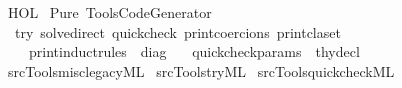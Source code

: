 %
\begin{isabellebody}%
%
%
\isadelimdocument
%
\endisadelimdocument
%
\isatagdocument
%
\isamarkuptrue%
%
\endisatagdocument
{\isafolddocument}%
%
\isadelimdocument
%
\endisadelimdocument
%
\isadelimtheory
%
\endisadelimtheory
%
\isatagtheory
{}\isamarkupfalse%
\ HOL\isanewline
{}\ Pure\ Tools{\isachardot}{\kern0pt}Code{\isacharunderscore}{\kern0pt}Generator\isanewline
{}\isanewline
\ \ {\isachardoublequoteopen}try{\isachardoublequoteclose}\ {\isachardoublequoteopen}solve{\isacharunderscore}{\kern0pt}direct{\isachardoublequoteclose}\ {\isachardoublequoteopen}quickcheck{\isachardoublequoteclose}\ {\isachardoublequoteopen}print{\isacharunderscore}{\kern0pt}coercions{\isachardoublequoteclose}\ {\isachardoublequoteopen}print{\isacharunderscore}{\kern0pt}claset{\isachardoublequoteclose}\isanewline
\ \ \ \ {\isachardoublequoteopen}print{\isacharunderscore}{\kern0pt}induct{\isacharunderscore}{\kern0pt}rules{\isachardoublequoteclose}\ {\isacharcolon}{\kern0pt}{\isacharcolon}{\kern0pt}\ diag\ \isanewline
\ \ {\isachardoublequoteopen}quickcheck{\isacharunderscore}{\kern0pt}params{\isachardoublequoteclose}\ {\isacharcolon}{\kern0pt}{\isacharcolon}{\kern0pt}\ thy{\isacharunderscore}{\kern0pt}decl\isanewline
{}\ {\isachardoublequoteopen}{\isacharquery}{\kern0pt}{\isacharless}{\kern0pt}{\isachardoublequoteclose}\ {\isacharequal}{\kern0pt}\ {\isachardoublequoteopen}{\isasymexists}\isactrlsub {\isasymle}\isanewline
{}%
\endisatagtheory
{\isafoldtheory}%
%
\isadelimtheory
\isanewline
%
\endisadelimtheory
%
\isadelimML
\isanewline
%
\endisadelimML
%
\isatagML
{}\isamarkupfalse%
\ {\isacartoucheopen}{\isachartilde}{\kern0pt}{\isachartilde}{\kern0pt}{\isacharslash}{\kern0pt}src{\isacharslash}{\kern0pt}Tools{\isacharslash}{\kern0pt}misc{\isacharunderscore}{\kern0pt}legacy{\isachardot}{\kern0pt}ML{\isacartoucheclose}\isanewline
{}\isamarkupfalse%
\ {\isacartoucheopen}{\isachartilde}{\kern0pt}{\isachartilde}{\kern0pt}{\isacharslash}{\kern0pt}src{\isacharslash}{\kern0pt}Tools{\isacharslash}{\kern0pt}try{\isachardot}{\kern0pt}ML{\isacartoucheclose}\isanewline
{}\isamarkupfalse%
\ {\isacartoucheopen}{\isachartilde}{\kern0pt}{\isachartilde}{\kern0pt}{\isacharslash}{\kern0pt}src{\isacharslash}{\kern0pt}Tools{\isacharslash}{\kern0pt}quickcheck{\isachardot}{\kern0pt}ML{\isacartoucheclose}\isanewline

\end{isabellebody}
